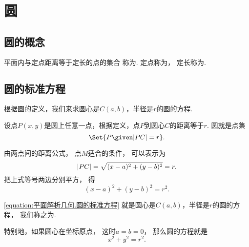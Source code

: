 \section{圆}
\subsection{圆的概念}
平面内与定点距离等于定长的点的集合
称为.
定点称为，
定长称为.

\subsection{圆的标准方程}
根据圆的定义，我们来求圆心是\(C(a,b)\)，半径是\(r\)的圆的方程.

设点\(P(x,y)\)是圆上任意一点，根据定义，点\(P\)到圆心\(C\)的距离等于\(r\).
圆就是点集\begin{equation*}
	\Set{ P \given \LineSegmentLength{PC} = r }.
\end{equation*}

由两点间的距离公式，
点\(M\)适合的条件，
可以表示为\begin{equation*}
	\abs{PC} = \sqrt{(x-a)^2+(y-b)^2} = r.
\end{equation*}
把上式等号两边分别平方，
得\begin{equation}\label{equation:平面解析几何.圆的标准方程}
	(x-a)^2+(y-b)^2 = r^2.
\end{equation}

\cref{equation:平面解析几何.圆的标准方程}
就是圆心是\(C(a,b)\)，半径是\(r\)的圆的方程，
我们称之为.

特别地，如果圆心在坐标原点，
这时\(a=b=0\)，
那么圆的方程就是\begin{equation}
	x^2 + y^2 = r^2.
\end{equation}

